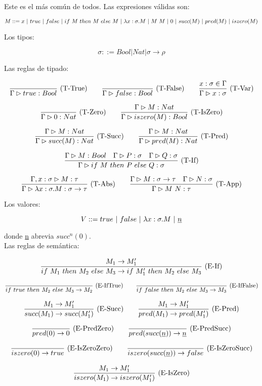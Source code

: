 Este es el más común de todos. Las expresiones válidas son:

\[ M ::= x \ |\  true \ |\  false \ |\  if\ M\ then\ M\ else\ M \ |\  \lambda x:\sigma.M \ |\  M\ M \ |\  0 \ |\  succ(M) \ |\  pred(M) \ |\  iszero(M) \]

Los tipos:

\[ \sigma ::= Bool \vert Nat \vert \sigma\to\rho \]

Las reglas de tipado:

\[\frac{}{\Gamma \rhd true : Bool}\ \text{(T-True)}\quad\quad \frac{}{\Gamma \rhd false : Bool}\ \text{(T-False)}\quad\quad \frac{x:\sigma\in\Gamma}{\Gamma \rhd x : \sigma}\ \text{(T-Var)}\]

\[\frac{}{\Gamma \rhd 0 : Nat}\ \text{(T-Zero)}\quad\quad \frac{\Gamma \rhd M : Nat}{\Gamma \rhd iszero(M) : Bool}\ \text{(T-IsZero)}\]

\[\frac{\Gamma \rhd M : Nat}{\Gamma \rhd succ(M) : Nat}\ \text{(T-Succ)}\quad\quad \frac{\Gamma \rhd M : Nat}{\Gamma \rhd pred(M) : Nat}\ \text{(T-Pred)}\]

\[\frac{\Gamma \rhd M : Bool\quad \Gamma \rhd P : \sigma\quad \Gamma \rhd Q : \sigma}{\Gamma \rhd if\ M\ then\ P\ else\ Q : \sigma}\ \text{(T-If)}\]

\[\frac{\Gamma,x :\sigma \rhd M : \tau}{\Gamma \rhd \lambda x:\sigma.M : \sigma\to\tau}\ \text{(T-Abs)}\quad\quad \frac{\Gamma \rhd M : \sigma\to\tau\quad \Gamma \rhd N : \sigma}{\Gamma \rhd M\ N : \tau}\ \text{(T-App)}\]

Los valores:

\[ V ::= true \ |\  false \ |\  \lambda x:\sigma.M \ |\  \underline{n} \]

donde \underline{n} abrevia $succ^n(0)$.\\

Las reglas de semántica:

\[\frac{M_1 \to M_1'}{if\ M_1\ then\ M_2\ else\ M_3\to if\ M_1'\ then\ M_2\ else\ M_3}\ \text{(E-If)}\]

\[\frac{}{if\ true\ then\ M_2\ else\ M_3 \to M_2}\ \text{(E-IfTrue)}\quad\quad \frac{}{if\ false\ then\ M_2\ else\ M_3 \to M_3}\ \text{(E-IfFalse)}\]

\[\frac{M_1 \to M_1'}{succ(M_1) \to succ(M_1')}\ \text{(E-Succ)}\quad\quad \frac{M_1 \to M_1'}{pred(M_1) \to pred(M_1')}\ \text{(E-Pred)}\]

\[\frac{}{pred(0) \to 0}\ \text{(E-PredZero)}\quad\quad \frac{}{pred(succ(\underline{n}))\to \underline{n}}\ \text{(E-PredSucc)}\]

\[\frac{}{iszero(0) \to true}\ \text{(E-IsZeroZero)}\quad\quad \frac{}{iszero(succ(\underline{n}))\to false}\ \text{(E-IsZeroSucc)}\]

\[\frac{M_1 \to M_1'}{iszero(M_1) \to iszero(M_1')}\ \text{(E-IsZero)}\]

